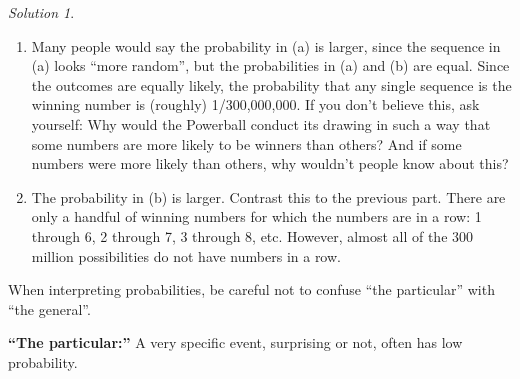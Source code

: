 \documentclass[
  letterpaper,
  DIV=11,
  numbers=noendperiod]{scrreprt}
\providecommand{\tightlist}{%
  \setlength{\itemsep}{0pt}\setlength{\parskip}{0pt}}
\theoremstyle{plain}
\theoremstyle{definition}
\theoremstyle{definition}
\theoremstyle{definition}
\theoremstyle{remark}
\newtheorem{refsolution}{Solution}[chapter]
\begin{document}

\begin{tcolorbox}[enhanced jigsaw, opacityback=0, rightrule=.15mm, coltitle=black, colframe=quarto-callout-tip-color-frame, toprule=.15mm, colbacktitle=quarto-callout-tip-color!10!white, opacitybacktitle=0.6, left=2mm, toptitle=1mm, breakable, title={Solution (click to expand)}, bottomtitle=1mm, colback=white, leftrule=.75mm, titlerule=0mm, arc=.35mm, bottomrule=.15mm]

\begin{refsolution}
\leavevmode

\begin{enumerate}
\def\labelenumi{\arabic{enumi}.}
\tightlist
\item
  Many people would say the probability in (a) is larger, since the
  sequence in (a) looks ``more random'', but the probabilities in (a)
  and (b) are equal. Since the outcomes are equally likely, the
  probability that any single sequence is the winning number is
  (roughly) 1/300,000,000. If you don't believe this, ask yourself: Why
  would the Powerball conduct its drawing in such a way that some
  numbers are more likely to be winners than others? And if some numbers
  were more likely than others, why wouldn't people know about this?
\item
  The probability in (b) is larger. Contrast this to the previous part.
  There are only a handful of winning numbers for which the numbers are
  in a row: 1 through 6, 2 through 7, 3 through 8, etc. However, almost
  all of the 300 million possibilities do not have numbers in a row.
\end{enumerate}

\label{sol-probability-interpret2}

\end{refsolution}

\end{tcolorbox}

When interpreting probabilities, be careful not to confuse ``the
particular'' with ``the general''.

\textbf{``The particular:''} A very specific event, surprising or not,
often has low probability.
\end{document}
